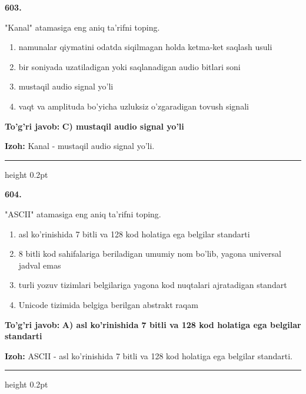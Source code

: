 \documentclass[10pt,a4paper,oneside]{article}
\begin{document}
\noindent\textbf{\color{ink}603.}
\par
"Kanal" atamasiga eng aniq ta'rifni toping.
\begin{enumerate}[label=\Alph*),leftmargin=9mm]
\item namunalar qiymatini odatda siqilmagan holda ketma-ket saqlash usuli
\item bir soniyada uzatiladigan yoki saqlanadigan audio bitlari soni
\item mustaqil audio signal yo'li
\item vaqt va amplituda bo'yicha uzluksiz o'zgaradigan tovush signali
\end{enumerate}
\begin{tcolorbox}[enhanced,breakable,colback=teal!4,colframe=teal!50!black,boxrule=0.5pt,arc=1.1mm,left=3mm,right=3mm,top=1.7mm,bottom=1.7mm,before skip=2mm,after skip=2mm]
\textbf{\color{teal}To'g'ri javob:} \textbf{C) mustaqil audio signal yo'li}
\par\smallskip
\textbf{Izoh:} Kanal - mustaqil audio signal yo'li.
\end{tcolorbox}
\vspace{2mm}\hrule height 0.2pt \vspace{3mm}

\noindent\textbf{\color{ink}604.}
\par
"ASCII" atamasiga eng aniq ta'rifni toping.
\begin{enumerate}[label=\Alph*),leftmargin=9mm]
\item asl ko'rinishida 7 bitli va 128 kod holatiga ega belgilar standarti
\item 8 bitli kod sahifalariga beriladigan umumiy nom bo'lib, yagona universal jadval emas
\item turli yozuv tizimlari belgilariga yagona kod nuqtalari ajratadigan standart
\item Unicode tizimida belgiga berilgan abstrakt raqam
\end{enumerate}
\begin{tcolorbox}[enhanced,breakable,colback=teal!4,colframe=teal!50!black,boxrule=0.5pt,arc=1.1mm,left=3mm,right=3mm,top=1.7mm,bottom=1.7mm,before skip=2mm,after skip=2mm]
\textbf{\color{teal}To'g'ri javob:} \textbf{A) asl ko'rinishida 7 bitli va 128 kod holatiga ega belgilar standarti}
\par\smallskip
\textbf{Izoh:} ASCII - asl ko'rinishida 7 bitli va 128 kod holatiga ega belgilar standarti.
\end{tcolorbox}
\vspace{2mm}\hrule height 0.2pt \vspace{3mm}
\end{document}
